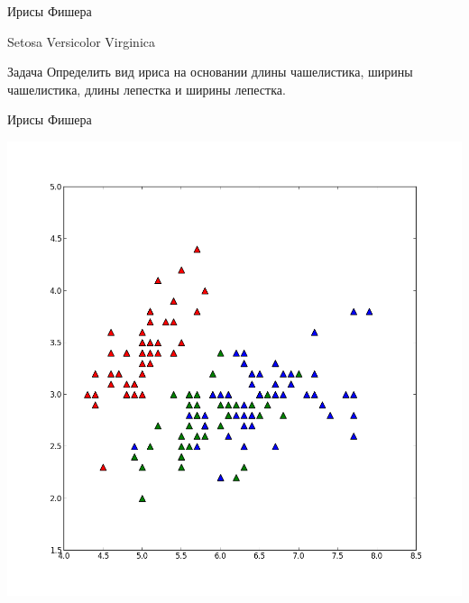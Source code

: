 \documentclass[10pt]{beamer}
\begin{document}
\begin{frame}{Ирисы Фишера}
\begin{center}
\end{center}
{\large \hspace{4.5em} Setosa \hspace{3.3em} Versicolor \hspace{2.5em} Virginica}

\begin{exampleblock}{Задача}
Определить вид ириса на основании длины чашелистика, ширины чашелистика, длины лепестка и ширины лепестка.
\end{exampleblock}

\end{frame}

\begin{frame}{Ирисы Фишера}

\begin{center}
\includegraphics[scale=0.2]{images/iris01.png} \;

\end{center}
\end{frame}
\end{document}
